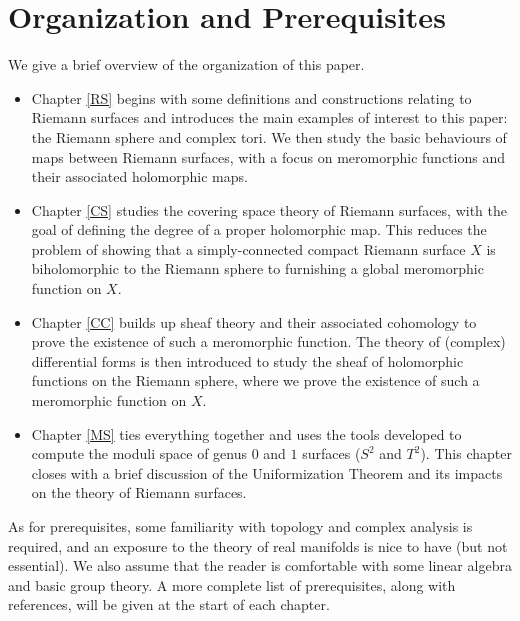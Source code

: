 \documentclass[../Moduli_Spaces_of_Riemann_Surfaces.tex]{subfiles}
\begin{document}
    \section{Organization and Prerequisites}
    We give a brief overview of the organization of this paper.
    \begin{itemize}
        \item Chapter \ref{RS} begins with some definitions and constructions relating to Riemann surfaces and introduces the main examples of interest to this paper: the Riemann sphere and complex tori. We then study the basic behaviours of maps between Riemann surfaces, with a focus on meromorphic functions and their associated holomorphic maps.
            \vspace{-0.05in}
        \item Chapter \ref{CS} studies the covering space theory of Riemann surfaces, with the goal of defining the degree of a proper holomorphic map. This reduces the problem of showing that a simply-connected compact Riemann surface $X$ is biholomorphic to the Riemann sphere to furnishing a global meromorphic function on $X$.
            \vspace{-0.05in}
        \item Chapter \ref{CC} builds up sheaf theory and their associated cohomology to prove the existence of such a meromorphic function. The theory of (complex) differential forms is then introduced to study the sheaf of holomorphic functions on the Riemann sphere, where we prove the existence of such a meromorphic function on $X$.
            \vspace{-0.05in}
        \item Chapter \ref{MS} ties everything together and uses the tools developed to compute the moduli space of genus $0$ and $1$ surfaces ($S^2$ and $T^2$). This chapter closes with a brief discussion of the Uniformization Theorem and its impacts on the theory of Riemann surfaces.
    \end{itemize}
    As for prerequisites, some familiarity with topology and complex analysis is required, and an exposure to the theory of real manifolds is nice to have (but not essential). We also assume that the reader is comfortable with some linear algebra and basic group theory. A more complete list of prerequisites, along with references, will be given at the start of each chapter.
\end{document}
